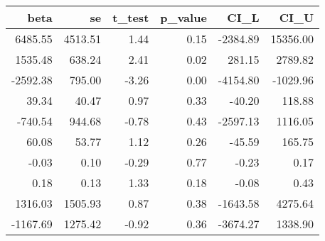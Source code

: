 \begin{tabular}{rrrrrr}
  \hline
beta & se & t\_test & p\_value & CI\_L & CI\_U \\ 
  \hline
6485.55 & 4513.51 & 1.44 & 0.15 & -2384.89 & 15356.00 \\ 
  1535.48 & 638.24 & 2.41 & 0.02 & 281.15 & 2789.82 \\ 
  -2592.38 & 795.00 & -3.26 & 0.00 & -4154.80 & -1029.96 \\ 
  39.34 & 40.47 & 0.97 & 0.33 & -40.20 & 118.88 \\ 
  -740.54 & 944.68 & -0.78 & 0.43 & -2597.13 & 1116.05 \\ 
  60.08 & 53.77 & 1.12 & 0.26 & -45.59 & 165.75 \\ 
  -0.03 & 0.10 & -0.29 & 0.77 & -0.23 & 0.17 \\ 
  0.18 & 0.13 & 1.33 & 0.18 & -0.08 & 0.43 \\ 
  1316.03 & 1505.93 & 0.87 & 0.38 & -1643.58 & 4275.64 \\ 
  -1167.69 & 1275.42 & -0.92 & 0.36 & -3674.27 & 1338.90 \\ 
   \hline
\end{tabular}
